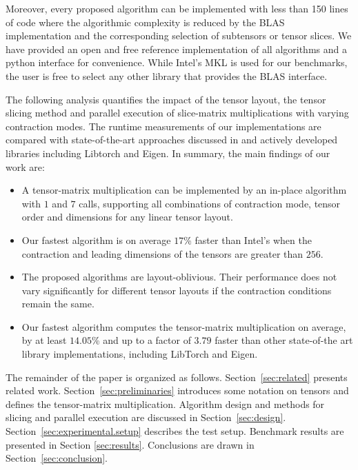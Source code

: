 Moreover, every proposed algorithm can be implemented with less than 150 lines of  code where the algorithmic complexity is reduced by the BLAS implementation and the corresponding selection of subtensors or tensor slices.
We have provided an open and free reference  implementation of all algorithms and a python interface for convenience.
While Intel's MKL is used for our benchmarks, the user is free to select any other library that provides the BLAS interface.

The following analysis quantifies the impact of the tensor layout, the tensor slicing method and parallel execution of slice-matrix multiplications with varying contraction modes.
The runtime measurements of our implementations are compared with state-of-the-art approaches discussed in \cite{springer:2018:design, matthews:2018:high} and actively developed libraries including Libtorch and Eigen. In summary, the main findings of our work are:
\begin{itemize}
	\item 
	A tensor-matrix multiplication can be implemented by an in-place algorithm with $1$  and $7$  calls, supporting all combinations of contraction mode, tensor order and dimensions for any linear tensor layout.
	\item 
	Our fastest algorithm is on average $17$\% faster than Intel's  when the contraction and leading dimensions of the tensors are greater than $256$.
	\item 
	The proposed algorithms are layout-oblivious. 
	Their performance does not vary significantly for different tensor layouts if the contraction conditions remain the same.
	\item
	Our fastest algorithm computes the tensor-matrix multiplication on average, by at least $14.05$\% and up to a factor of $3.79$ faster than other state-of-the art library implementations, including LibTorch and Eigen.
\end{itemize}

The remainder of the paper is organized as follows. 
Section~\ref{sec:related} presents related work.
Section~\ref{sec:preliminaries} introduces some notation on tensors and defines the tensor-matrix multiplication.
Algorithm design and methods for slicing and parallel execution are discussed in Section~\ref{sec:design}.
Section~\ref{sec:experimental.setup} describes the test setup. Benchmark results are presented in Section \ref{sec:results}.
Conclusions are drawn in Section~\ref{sec:conclusion}.